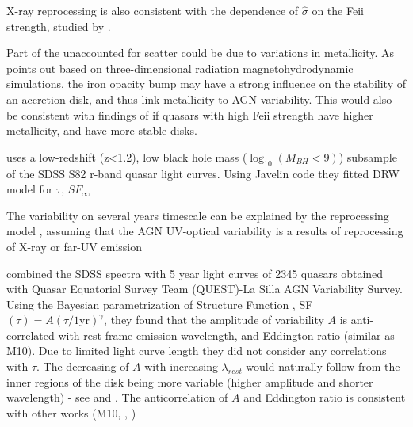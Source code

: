 \documentclass[twocolumn]{aastex62}
\begin{document}
X-ray reprocessing is also consistent with  the dependence of $\hat{\sigma}$ on the Fe{\sc ii} strength, studied by \citep{sun2018}. 


Part of the unaccounted for scatter could be due to variations in metallicity.  As \cite{jiang2016} points out based on three-dimensional radiation magnetohydrodynamic simulations, the iron opacity bump may have a strong influence on the stability of an accretion disk, and thus link metallicity to AGN variability. This would also be consistent with findings of \cite{sun2018} if quasars with high  Fe{\sc ii} strength have higher metallicity, and have more stable disks. 




\citep{guo2017} uses a low-redshift (z<1.2), low black hole mass ($\log_{10}{(M_{BH}<9)}$)  subsample of the SDSS S82 r-band quasar light curves. Using Javelin \cite{zu2011} code they fitted DRW model for $\tau$, $SF_{\infty}$ 


The variability on several years timescale can be explained by the reprocessing model \cite{kokubo2015}, assuming that the AGN UV-optical variability is a results of reprocessing of X-ray or far-UV emission \citep{krolik1991}

\citep{sanchez2018} combined the SDSS spectra with 5 year light curves of 2345 quasars obtained with Quasar Equatorial Survey Team (QUEST)-La Silla AGN Variability Survey. Using the Bayesian parametrization of Structure Function \citep{schmidt2010},  SF$(\tau) = A(\tau/1 \mathrm{yr})^{\gamma} $, they found that the amplitude of variability $A$ is anti-correlated with rest-frame emission wavelength,  and Eddington ratio (similar as M10).  Due to limited light curve length they did not consider any correlations with $\tau$. The decreasing of  $A$ with increasing  $\lambda_{rest}$ would naturally follow from the inner regions of the disk being more variable (higher amplitude and  shorter wavelength) - see \citep{fausnaugh2016} and \citep{edelson2015}. The anticorrelation of $A$ and Eddington ratio is consistent with other works (M10, \citealt{simm2016}, \citealt{rakshit2017})
\end{document}

